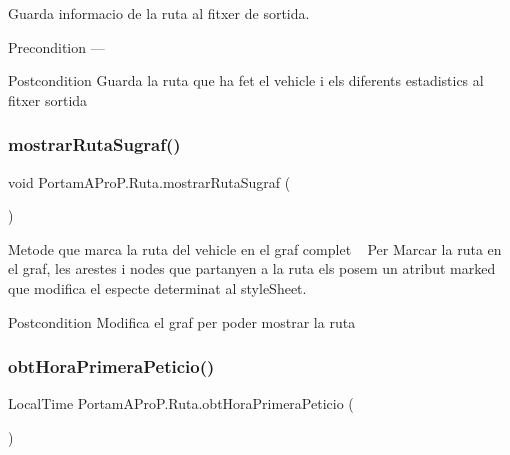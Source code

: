 Guarda informacio de la ruta al fitxer de sortida. 

\begin{DoxyPrecond}{Precondition}
--- 
\end{DoxyPrecond}
\begin{DoxyPostcond}{Postcondition}
Guarda la ruta que ha fet el vehicle i els diferents estadistics al fitxer sortida 
\end{DoxyPostcond}
\mbox{\label{class_portam_a_pro_p_1_1_ruta_ad9ddcde56ed5dae239ea466e76472978}} 
\subsubsection{\texorpdfstring{mostrar\+Ruta\+Sugraf()}{mostrarRutaSugraf()}}
{\footnotesize\ttfamily void Portam\+A\+Pro\+P.\+Ruta.\+mostrar\+Ruta\+Sugraf (\begin{DoxyParamCaption}{ }\end{DoxyParamCaption})}



Metode que marca la ruta del vehicle en el graf complet ~\newline
 Per Marcar la ruta en el graf, les arestes i nodes que partanyen a la ruta els posem un atribut marked que modifica el especte determinat al style\+Sheet. 

\begin{DoxyPostcond}{Postcondition}
Modifica el graf per poder mostrar la ruta 
\end{DoxyPostcond}
\mbox{\label{class_portam_a_pro_p_1_1_ruta_a1c55ea94e7f905523f8fca83fafa6eff}} 
\subsubsection{\texorpdfstring{obt\+Hora\+Primera\+Peticio()}{obtHoraPrimeraPeticio()}}
{\footnotesize\ttfamily Local\+Time Portam\+A\+Pro\+P.\+Ruta.\+obt\+Hora\+Primera\+Peticio (\begin{DoxyParamCaption}{ }\end{DoxyParamCaption})}



